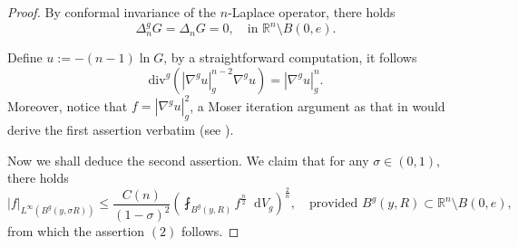 \documentclass[10pt,a4paper]{amsart}
\numberwithin{equation}{section}
\newcommand{\dd}{\mathop{}\!\mathrm{d}}%
\newcommand{\nablag}{\nabla^g} %
\begin{document}
\begin{proof}
    By conformal invariance of the $n$-Laplace operator, there holds
    \[
        \Delta_n^g G=\Delta_n G=0,\quad \text{in } \mathbb{R}^n\setminus B(0,e).
    \]

    Define $u:=-(n-1)\ln G$, by a straightforward computation, it follows
    \[
        \mathrm{div}^g(|\nablag u|_g^{n-2}\nablag u)=|\nablag u|_g^n.
    \]
    Moreover, notice that $f=|\nabla^g u|_g^2$,  a Moser iteration argument as that in \cite[Theorem 1.1]{WZ} would derive the first assertion   verbatim (see \cite[(2.18)]{WZ}). 

    Now we shall deduce the second assertion.
    We claim that for any $\sigma\in (0,1)$, there holds
    \[
        |f|_{L^{\infty}(B^g(y,\sigma R))}\leq 
        \frac{C(n)}{(1-\sigma)^2}
        \left(
            \fint_{B^g(y,R)}f^{\frac{n}{2}}\dd V_g
            \right)^{\frac{2}{n}},
            \quad \text{provided } B^g(y,R)\subset \mathbb{R}^n\setminus B(0,e),
    \]
    from which the assertion $(2)$ follows.


\end{proof}
\end{document}
